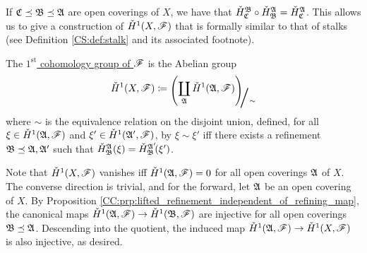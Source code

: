 \documentclass[../Moduli_Spaces_of_Riemann_Surfaces.tex]{subfiles}
\begin{document}
    \begin{remark}
        If $\mathfrak{C}\preceq\mathfrak{B}\preceq\mathfrak{A}$ are open coverings of $X$, we have that $\check{H}^{\mathfrak{B}}_{\mathfrak{C}}\circ\check{H}^{\mathfrak{A}}_{\mathfrak{B}}=\check{H}^{\mathfrak{A}}_{\mathfrak{C}}$. This allows us to give a construction of $\check{H}^1\!\left(X,\mathscr{F}\right)$ that is formally similar to that of stalks (see Definition \ref{CS:def:stalk} and its associated footnote).\exqed
    \end{remark}
    \begin{definition}
        The \ul{$1^\textrm{st}$ cohomology group of $\mathscr{F}$} is the Abelian group
        \begin{equation*}
            \check{H}^1\!\l(X,\ms{F}\r)\coloneqq\raisebox{-2pt}{$\Biggl(\!$}\coprod_{\mf{A}}\check{H}^1\!\l(\mf{A},\ms{F}\r)\!\raisebox{-2pt}{$\Biggr)$}\!\!_{\scalebox{2}{/}\sim}
        \end{equation*}
        where $\sim$ is the equivalence relation on the disjoint union, defined, for all $\xi\in\check{H}^1\!\left(\mathfrak{A},\mathscr{F}\right)$ and $\xi'\in\check{H}^1\!\left(\mathfrak{A}',\mathscr{F}\right)$, by $\xi\sim\xi'$ iff there exists a refinement $\mathfrak{B}\preceq\mathfrak{A},\mathfrak{A}'$ such that $\check{H}^{\mathfrak{A}}_{\mathfrak{B}}\!\left(\xi\right)=\check{H}^{\mathfrak{A}'}_{\mathfrak{B}}\!\!\left(\xi'\right)$.
    \end{definition}
    \begin{remark}
        Note that $\check{H}^1\!\left(X,\mathscr{F}\right)$ vanishes iff $\check{H}^1\!\left(\mathfrak{A},\mathscr{F}\right)=0$ for all open coverings $\mathfrak{A}$ of $X$. The converse direction is trivial, and for the forward, let $\mathfrak{A}$ be an open covering of $X$. By Proposition \ref{CC:prp:lifted_refinement_independent_of_refining_map}, the canonical maps $\check{H}^1\!\left(\mathfrak{A},\mathscr{F}\right)\to\check{H}^1\!\left(\mathfrak{B},\mathscr{F}\right)$ are injective for all open coverings $\mathfrak{B}\preceq\mathfrak{A}$. Descending into the quotient, the induced map $\check{H}^1\!\left(\mathfrak{A},\mathscr{F}\right)\to\check{H}^1\!\left(X,\mathscr{F}\right)$ is also injective, as desired.\exqed
    \end{remark}
\end{document}
